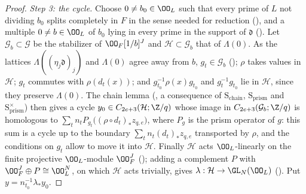 \begin{proof}
\emph{Step 3: the cycle.} Choose $0\ne b_0\in\OO_L$ such that every prime of $L$ not dividing $b_0$ splits completely in $F$ in
the sense needed for reduction (), and a multiple $0\ne b\in\OO_L$ of $b_0$ lying in every
prime in the support of $\mathfrak d$ (). Let $\mathcal G_b\subset\mathcal G$ be the
stabilizer of $\OO_F[1/b]^J$ and $\mathcal H\subset\mathcal G_b$ that of $\Lambda(0)$. As the lattices $\Lambda((\eta_j\mathfrak
d)_j)$ and $\Lambda(0)$ agree away from $b$, $g_t\in\mathcal G_b$ (); $\rho$ takes values in
$\mathcal H$; $g_t$ commutes with $\rho(d_t(x))$; and $g_{t_0}^{-1}\rho(x)g_{t_0}$ and $g_t^{-1}g_{t_0}$ lie in $\mathcal H$, since
they preserve $\Lambda(0)$. The chain lemma (, a consequence of
$\mathrm S_{\mathrm{chain}}$, $\mathrm S_{\mathrm{prism}}$ and $\mathrm S^\times_{\mathrm{prism}}$) then gives a cycle
$y_0\in C_{2e+3}(\mathcal H;\Z/q)$ whose image in $C_{2e+3}(\mathcal G_b;\Z/q)$ is homologous to
$\sum_tn_tP_{g_t}\bigl((\rho\circ d_t)_*z_{q,e}\bigr)$, where $P_g$ is the prism operator of $g$: this sum is a cycle up to the
boundary $\sum_tn_t(d_t)_*z_{q,e}$ transported by $\rho$, and the conditions on $g_t$ allow to move it into $\mathcal H$.
Finally $\mathcal H$ acts $\OO_L$-linearly on the finite projective $\OO_L$-module $\OO_F^J$
(); adding a complement $P$ with $\OO_F^J\oplus P\cong\OO_L^N$, on which $\mathcal H$ acts
trivially, gives $\lambda:\mathcal H\to\GL_N(\OO_L)$ (). Put $y=n_{t_0}^{-1}\lambda_*y_0$.


\end{proof}
